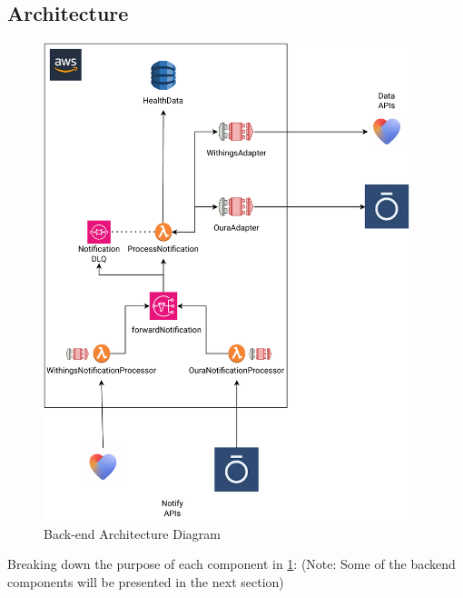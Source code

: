 \subsection{Architecture}
\begin{figure}
    
    \centering
    \includegraphics[width=0.95\textwidth,height=\textheight,keepaspectratio]{../images/backend.pdf}
    \caption{Back-end Architecture Diagram}
    \label{fig:backend}
    
\end{figure}
Breaking down the purpose of each component in \ref{fig:backend}: (Note: Some of the backend components will be presented in the next section)
